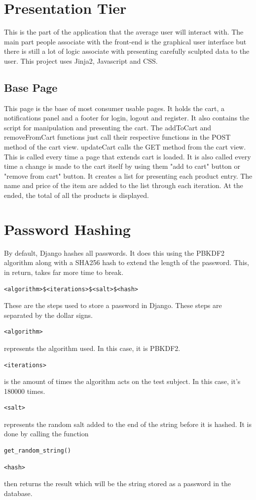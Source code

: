 \section{Presentation Tier}
This is the part of the application that the average user will interact with. The main part people associate with the front-end is the graphical user interface but there is still a lot of logic associate with presenting carefully sculpted data to the user. This project uses Jinja2, Javascript and CSS.
\subsection{Base Page}
This page is the base of most consumer usable pages. It holds the cart, a notifications panel and a footer for login, logout and register. It also contains the script for manipulation and presenting the cart. 
The addToCart and removeFromCart functions just call their respective functions in the POST method of the cart view. 
updateCart calls the GET method from the cart view. This is called every time a page that extends cart is loaded. It is also called every time a change is made to the cart itself by using them "add to cart" button or "remove from cart" button. It creates a list for presenting each product entry. The name and price of the item are added to the list through each iteration. At the ended, the total of all the products is displayed. 

\section{Password Hashing}
By default, Django hashes all passwords. It does this using the PBKDF2 algorithm along with a SHA256 hash to extend the length of the password. This, in return, takes far more time to break.
\begin{verbatim}<algorithm>$<iterations>$<salt>$<hash>\end{verbatim}
These are the steps used to store a password in Django. These steps are separated by the dollar signs. 
\begin{verbatim}<algorithm>\end{verbatim} represents the algorithm used. In this case, it is PBKDF2.
\begin{verbatim}<iterations>\end{verbatim} is the amount of times the algorithm acts on the test subject. In this case, it's 180000 times.
\begin{verbatim}<salt>\end{verbatim} represents the random salt added to the end of the string before it is hashed. It is done by calling the function \begin{verbatim}get_random_string()\end{verbatim}
\begin{verbatim}<hash>\end{verbatim} then returns the result which will be the string stored as a password in the database.

